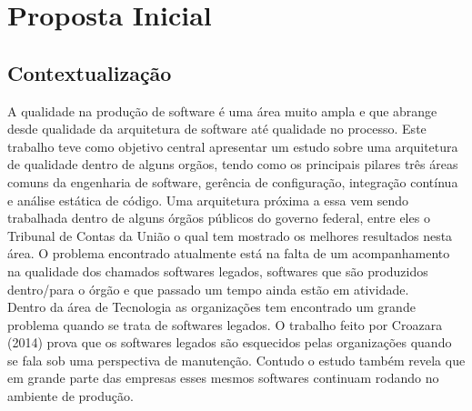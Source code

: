 
\chapter[Proposta Inicial]{Proposta Inicial}

\section{Contextualização}
	A qualidade na produção de software é uma área muito ampla e que abrange desde qualidade da arquitetura de software até qualidade no processo. Este trabalho teve como objetivo central apresentar um estudo sobre uma arquitetura de qualidade dentro de alguns orgãos, tendo como os principais pilares três áreas comuns da engenharia de software, gerência de configuração, integração contínua e análise estática de código. Uma arquitetura próxima a essa vem sendo trabalhada dentro de alguns órgãos públicos do governo federal, entre eles o Tribunal de Contas da União o qual tem mostrado os melhores resultados nesta área. O problema encontrado atualmente está na falta de um acompanhamento na qualidade dos chamados softwares legados, softwares que são produzidos dentro/para o órgão e que passado um tempo ainda estão em atividade.
	\\Dentro da área de Tecnologia as organizações tem encontrado um grande problema quando se trata de softwares legados. O trabalho feito por Croazara (2014) prova que os softwares legados são esquecidos pelas organizações quando se fala sob uma perspectiva de manutenção. Contudo o estudo também revela que em grande parte das empresas esses mesmos softwares continuam rodando no ambiente de produção.
	
	
	
